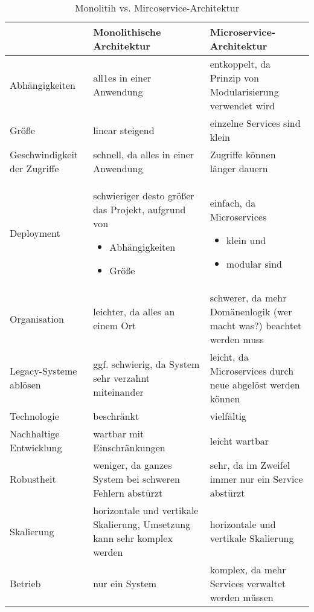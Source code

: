 \begin{table}
	\begin{center}
		\begin{tabular}{p{4cm}p{5cm}p{5cm}}
			& Monolithische Architektur & Microservice-Architektur \\ \hline
			Abhängigkeiten & all1es in einer Anwendung & entkoppelt, da Prinzip von Modularisierung verwendet wird \\
			Größe & linear steigend & einzelne Services sind klein \\
			Geschwindigkeit der Zugriffe & schnell, da alles in einer Anwendung & Zugriffe können länger dauern \\ 
			Deployment & schwieriger desto größer das Projekt, aufgrund von
			\begin{itemize}
				\item Abhängigkeiten  
				\item Größe \end{itemize}
			 & einfach, da Microservices \begin{itemize}
				\item klein und 
			    \item modular sind \end{itemize} \\
			Organisation & leichter, da alles an einem Ort & schwerer, da mehr Domänenlogik (wer macht was?) beachtet werden muss \\
			Legacy-Systeme ablösen & ggf. schwierig, da System sehr verzahnt miteinander & leicht, da Microservices durch neue abgelöst werden können \\
			Technologie & beschränkt & vielfältig \\
			Nachhaltige Entwicklung & wartbar mit Einschränkungen & leicht wartbar \\
			Robustheit & weniger, da ganzes System bei schweren Fehlern abstürzt & sehr, da im Zweifel immer nur ein Service abstürzt \\
			Skalierung & horizontale und vertikale Skalierung, Umsetzung kann sehr komplex werden &  horizontale und vertikale Skalierung \\
			Betrieb & nur ein System & komplex, da mehr Services verwaltet werden müssen
		\end{tabular}
	\end{center}
	\caption[Monolitih vs. Mircoservice-Architektur]{Monolitih vs. Mircoservice-Architektur}
	\label{tab:mono_vs_microservices} 
\end{table}


